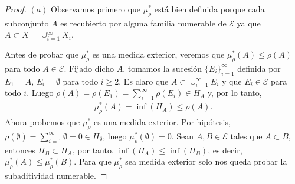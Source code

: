 \begin{proof}
    $(a)$ Observamos primero que $\mu_{\rho}^*$ está bien definida porque cada subconjunto $A$ es recubierto por alguna familia numerable de $\mathcal{E}$ ya que $A \subset X = \cup_{i=1}^{\infty}{X_i}$.

    Antes de probar que $\mu_{\rho}^*$ es una medida exterior, veremos que $\mu_{\rho}^*(A) \leq \rho(A)$ para todo $A \in \mathcal{E}$. Fijado dicho $A$, tomamos la sucesión $\{E_i\}_{i=1}^{\infty}$ definida por $E_1 = A$, $E_i = \emptyset$ para todo $i \ge 2$. Es claro que $A \subset \cup_{i=1}^{\infty}{E_i}$ y que $E_i \in \mathcal{E}$ para todo $i$. Luego $\rho(A) = \rho(E_1) = \sum_{i=1}^{\infty}{\rho(E_i)} \in H_A$ y, por lo tanto,
    \begin{align*}
        \mu_{\rho}^*(A) = \inf(H_A) \leq \rho(A).
    \end{align*}
    Ahora probemos que $\mu_{\rho}^*$ es una medida exterior. Por hipótesis, $\rho(\emptyset) = \sum_{i=1}^{\infty}{\emptyset} = 0 \in H_{\emptyset}$, luego $\mu_{\rho}^*(\emptyset) = 0$. Sean $A, B \in \mathcal{E}$ tales que $A \subset B$, entonces $H_B \subset H_A$, por tanto, $\inf(H_A) \leq \inf(H_B)$, es decir, $\mu_{\rho}^*(A) \leq \mu_{\rho}^*(B)$. Para que $\mu_{\rho}^*$ sea medida exterior solo nos queda probar la subaditividad numerable.


\end{proof}
